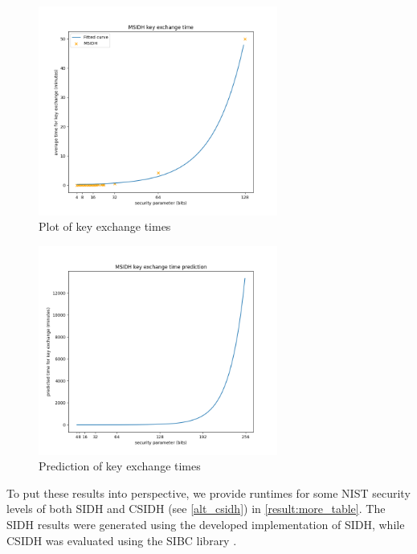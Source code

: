 \documentclass[a4paper,11pt,oneside]{report}
\begin{document}
    \begin{figure}
        \centering
        \includegraphics[width=0.7\textwidth]{img/Figure_1.png}
        \caption{Plot of key exchange times}
        \label{fig:ex1}
    \end{figure}

    \begin{figure}
        \centering
        \includegraphics[width=0.7\textwidth]{img/Figure_2.png}
        \caption{Prediction of key exchange times}
        \label{fig:ex2}
    \end{figure}

    To put these results into perspective, we provide runtimes for some NIST security levels of both SIDH \cite{original-sidh} and CSIDH \cite{csidh} (see \autoref{alt_csidh}) in  \autoref{result:more_table}. The SIDH results were generated using the developed implementation of SIDH, while CSIDH was evaluated using the SIBC library \cite{sibc}.
\end{document}
